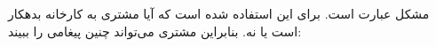 \section{}
\paragraph{}\label{answer:38}
مشکل عبارت  است. برای این استفاده شده است که آیا مشتری به کارخانه بدهکار است یا نه. بنابراین مشتری می‌تواند چنین پیغامی را ببیند:

